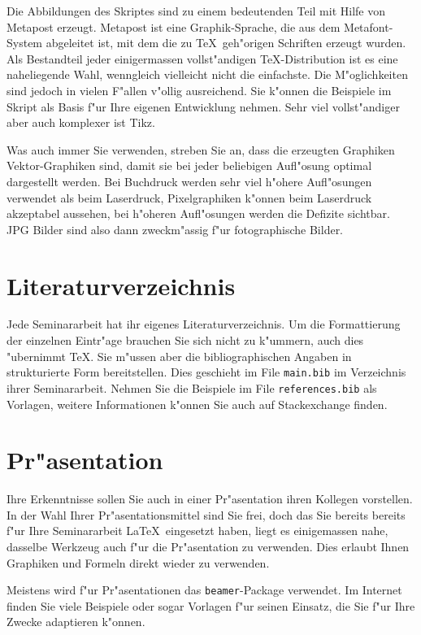 \documentclass[a4paper,12pt]{article}
\begin{document}
Die Abbildungen des Skriptes sind zu einem bedeutenden Teil mit
Hilfe von Metapost erzeugt.
Metapost ist eine Graphik-Sprache, die aus dem Metafont-System abgeleitet ist,
mit dem die zu \TeX\ geh"origen Schriften erzeugt wurden.
Als Bestandteil jeder einigermassen vollst"andigen TeX-Distribution
ist es eine naheliegende Wahl, wenngleich vielleicht nicht die einfachste.
Die M"oglichkeiten sind jedoch in vielen F"allen v"ollig ausreichend.
Sie k"onnen die Beispiele im Skript als Basis f"ur Ihre eigenen Entwicklung
nehmen.
Sehr viel vollst"andiger aber auch komplexer ist Tikz.

Was auch immer Sie verwenden, streben Sie an, dass die erzeugten Graphiken
Vektor-Graphiken sind, damit sie bei jeder beliebigen Aufl"osung
optimal dargestellt werden.
Bei Buchdruck werden sehr viel h"ohere Aufl"osungen verwendet als
beim Laserdruck, Pixelgraphiken k"onnen beim Laserdruck akzeptabel
aussehen, bei h"oheren Aufl"osungen werden die Defizite sichtbar.
JPG Bilder sind also dann zweckm"assig f"ur fotographische Bilder.

\section{Literaturverzeichnis}
Jede Seminararbeit hat ihr eigenes Literaturverzeichnis.
Um die Formattierung der einzelnen Eintr"age brauchen Sie sich nicht
zu k"ummern, auch dies "ubernimmt \TeX.
Sie m"ussen aber die bibliographischen Angaben in strukturierte
Form bereitstellen. 
Dies geschieht im File \texttt{main.bib} im Verzeichnis ihrer
Seminararbeit.
Nehmen Sie die Beispiele im File \texttt{references.bib} als
Vorlagen, weitere Informationen k"onnen Sie auch auf Stackexchange finden.

\section{Pr"asentation}
Ihre Erkenntnisse sollen Sie auch in einer Pr"asentation ihren Kollegen
vorstellen.
In der Wahl Ihrer Pr"asentationsmittel sind Sie frei, doch das Sie
bereits bereits f"ur Ihre Seminararbeit \LaTeX\ eingesetzt haben, 
liegt es einigemassen nahe, dasselbe Werkzeug auch f"ur die Pr"asentation
zu verwenden.
Dies erlaubt Ihnen Graphiken und Formeln direkt wieder zu verwenden.

Meistens wird f"ur Pr"asentationen das \texttt{beamer}-Package 
verwendet.
Im Internet finden Sie viele Beispiele oder sogar Vorlagen f"ur
seinen Einsatz, die Sie f"ur Ihre Zwecke adaptieren k"onnen.
\end{document}
